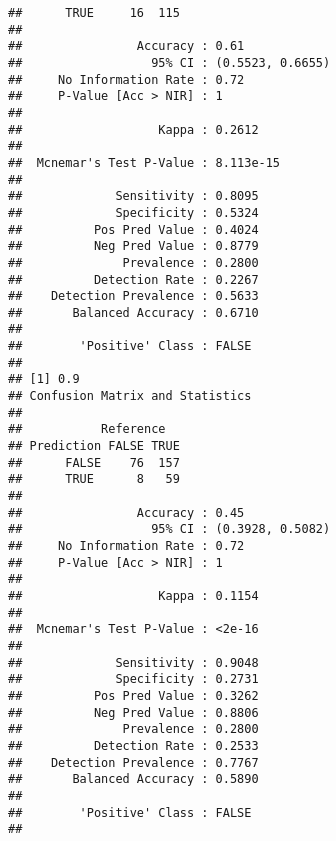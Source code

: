 \documentclass[]{article}
\newenvironment{Shaded}{\begin{snugshade}}{\end{snugshade}}
\newcommand{\DataTypeTok}[1]{\textcolor[rgb]{0.13,0.29,0.53}{#1}}
\newcommand{\DecValTok}[1]{\textcolor[rgb]{0.00,0.00,0.81}{#1}}
\newcommand{\FloatTok}[1]{\textcolor[rgb]{0.00,0.00,0.81}{#1}}
\newcommand{\KeywordTok}[1]{\textcolor[rgb]{0.13,0.29,0.53}{\textbf{#1}}}
\newcommand{\NormalTok}[1]{#1}
\newcommand{\OperatorTok}[1]{\textcolor[rgb]{0.81,0.36,0.00}{\textbf{#1}}}
\begin{document}
\begin{verbatim}
##      TRUE     16  115
##                                           
##                Accuracy : 0.61            
##                  95% CI : (0.5523, 0.6655)
##     No Information Rate : 0.72            
##     P-Value [Acc > NIR] : 1               
##                                           
##                   Kappa : 0.2612          
##                                           
##  Mcnemar's Test P-Value : 8.113e-15       
##                                           
##             Sensitivity : 0.8095          
##             Specificity : 0.5324          
##          Pos Pred Value : 0.4024          
##          Neg Pred Value : 0.8779          
##              Prevalence : 0.2800          
##          Detection Rate : 0.2267          
##    Detection Prevalence : 0.5633          
##       Balanced Accuracy : 0.6710          
##                                           
##        'Positive' Class : FALSE           
##                                           
## [1] 0.9
## Confusion Matrix and Statistics
## 
##           Reference
## Prediction FALSE TRUE
##      FALSE    76  157
##      TRUE      8   59
##                                           
##                Accuracy : 0.45            
##                  95% CI : (0.3928, 0.5082)
##     No Information Rate : 0.72            
##     P-Value [Acc > NIR] : 1               
##                                           
##                   Kappa : 0.1154          
##                                           
##  Mcnemar's Test P-Value : <2e-16          
##                                           
##             Sensitivity : 0.9048          
##             Specificity : 0.2731          
##          Pos Pred Value : 0.3262          
##          Neg Pred Value : 0.8806          
##              Prevalence : 0.2800          
##          Detection Rate : 0.2533          
##    Detection Prevalence : 0.7767          
##       Balanced Accuracy : 0.5890          
##                                           
##        'Positive' Class : FALSE           
## 
\end{verbatim}

\begin{Shaded}
\end{Shaded}
\end{document}
